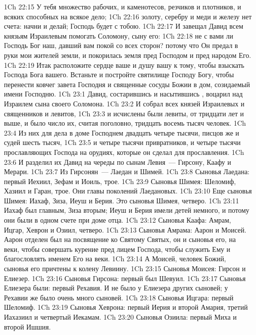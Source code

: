 \vs 1Ch 22:15 У тебя множество рабочих, и каменотесов, резчиков и плотников, и всяких способных на всякое дело;
\vs 1Ch 22:16 золоту, серебру и меди и железу нет счета: начни и делай; Господь будет с тобою.
\rsbpar\vs 1Ch 22:17 И завещал Давид всем князьям Израилевым помогать Соломону, сыну его:
\vs 1Ch 22:18 не с вами ли Господь Бог наш, давший вам покой со всех сторон? потому что Он предал в руки мои жителей земли, и покорилась земля пред Господом и пред народом Его.
\vs 1Ch 22:19 Итак расположите сердце ваше и душу вашу к тому, чтобы взыскать Господа Бога вашего. Встаньте и постройте святилище Господу Богу, чтобы перенести ковчег завета Господня и священные сосуды Божии в дом, созидаемый имени Господню.
\vs 1Ch 23:1 Давид, состарившись и насытившись , воцарил над Израилем сына своего Соломона.
\vs 1Ch 23:2 И собрал всех князей Израилевых и священников и левитов,
\vs 1Ch 23:3 и исчислены были левиты, от тридцати лет и выше, и было число их, считая поголовно, тридцать восемь тысяч человек.
\vs 1Ch 23:4 Из них  для дела в доме Господнем двадцать четыре тысячи, писцов же и судей шесть тысяч,
\vs 1Ch 23:5 и четыре тысячи привратников, и четыре тысячи прославляющих Господа на  орудиях, которые он сделал для прославления.
\rsbpar\vs 1Ch 23:6 И разделил их Давид на череды по сынам Левия~--- Гирсону, Каафу и Мерари.
\vs 1Ch 23:7 Из Гирсонян~--- Лаедан и Шимей.
\vs 1Ch 23:8 Сыновья Лаедана: первый Иехиил, Зефам и Иоиль, трое.
\vs 1Ch 23:9 Сыновья Шимея: Шеломиф, Хазиил и Гаран, трое. Они главы поколений Лаедановых.
\vs 1Ch 23:10 Еще сыновья Шимея: Иахаф, Зиза, Иеуш и Берия. Это сыновья Шимея, четверо.
\vs 1Ch 23:11 Иахаф был главным, Зиза вторым; Иеуш и Берия имели детей немного, и потому они были в одном счете при доме отца.
\vs 1Ch 23:12 Сыновья Каафа: Амрам, Ицгар, Хеврон и Озиил, четверо.
\rsbpar\vs 1Ch 23:13 Сыновья Амрама: Аарон и Моисей. Аарон отделен был на посвящение ко Святому Святых, он и сыновья его, на веки, чтобы совершать курение пред лицем Господа, чтобы служить Ему и благословлять именем Его на веки.
\vs 1Ch 23:14 А Моисей, человек Божий,  сыновья его причтены к колену Левиину.
\vs 1Ch 23:15 Сыновья Моисея: Гирсон и Елиезер.
\vs 1Ch 23:16 Сыновья Гирсона: первый был Шевуил.
\vs 1Ch 23:17 Сыновья Елиезера были: первый Рехавия. И не было у Елиезера других сыновей; у Рехавии же было очень много сыновей.
\vs 1Ch 23:18 Сыновья Ицгара: первый Шеломиф.
\vs 1Ch 23:19 Сыновья Хеврона: первый Иерия и второй Амария, третий Иахазиил и четвертый Иекамам.
\vs 1Ch 23:20 Сыновья Озиила: первый Миха и второй Ишшия.
